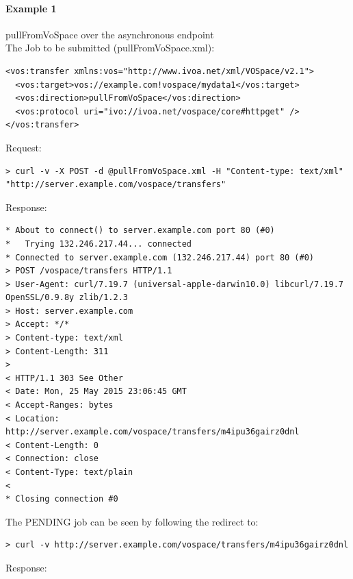 \documentclass[11pt,a4paper]{ivoa}
\begin{document}
\paragraph{Example 1}
pullFromVoSpace over the asynchronous endpoint
\\[5px]
\noindent
The Job to be submitted (pullFromVoSpace.xml):
\begin{lstlisting}
<vos:transfer xmlns:vos="http://www.ivoa.net/xml/VOSpace/v2.1">
  <vos:target>vos://example.com!vospace/mydata1</vos:target>
  <vos:direction>pullFromVoSpace</vos:direction>
  <vos:protocol uri="ivo://ivoa.net/vospace/core#httpget" />
</vos:transfer>
\end{lstlisting}
Request:
\begin{lstlisting}
> curl -v -X POST -d @pullFromVoSpace.xml -H "Content-type: text/xml" "http://server.example.com/vospace/transfers"
\end{lstlisting}
Response:
\begin{lstlisting}
* About to connect() to server.example.com port 80 (#0)
*   Trying 132.246.217.44... connected
* Connected to server.example.com (132.246.217.44) port 80 (#0)
> POST /vospace/transfers HTTP/1.1
> User-Agent: curl/7.19.7 (universal-apple-darwin10.0) libcurl/7.19.7 OpenSSL/0.9.8y zlib/1.2.3
> Host: server.example.com
> Accept: */*
> Content-type: text/xml
> Content-Length: 311
>
< HTTP/1.1 303 See Other
< Date: Mon, 25 May 2015 23:06:45 GMT
< Accept-Ranges: bytes
< Location: http://server.example.com/vospace/transfers/m4ipu36gairz0dnl
< Content-Length: 0
< Connection: close
< Content-Type: text/plain
<
* Closing connection #0
\end{lstlisting}
The PENDING job can be seen by following the redirect to:
\begin{lstlisting}
> curl -v http://server.example.com/vospace/transfers/m4ipu36gairz0dnl
\end{lstlisting}
Response:
\end{document}
